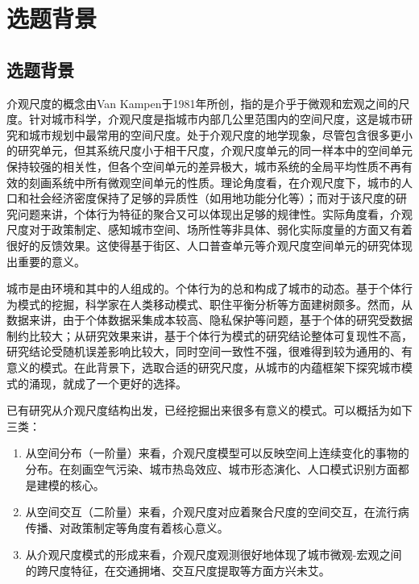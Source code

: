 \chapter{选题背景}
\setcounter{page}{1}


\section{选题背景} %


介观尺度的概念由Van Kampen于1981年所创，指的是介乎于微观和宏观之间的尺度。针对城市科学，介观尺度是指城市内部几公里范围内的空间尺度，这是城市研究和城市规划中最常用的空间尺度。处于介观尺度的地学现象，尽管包含很多更小的研究单元，但其系统尺度小于相干尺度，介观尺度单元的同一样本中的空间单元保持较强的相关性，但各个空间单元的差异极大，城市系统的全局平均性质不再有效的刻画系统中所有微观空间单元的性质。理论角度看，在介观尺度下，城市的人口和社会经济密度保持了足够的异质性（如用地功能分化等）；而对于该尺度的研究问题来讲，个体行为特征的聚合又可以体现出足够的规律性。实际角度看，介观尺度对于政策制定、感知城市空间、场所性等非具体、弱化实际度量的方面又有着很好的反馈效果。这使得基于街区、人口普查单元等介观尺度空间单元的研究体现出重要的意义。


城市是由环境和其中的人组成的。个体行为的总和构成了城市的动态。基于个体行为模式的挖掘，科学家在人类移动模式、职住平衡分析等方面建树颇多。然而，从数据来讲，由于个体数据采集成本较高、隐私保护等问题，基于个体的研究受数据制约比较大；从研究效果来讲，基于个体行为模式的研究结论整体可复现性不高，研究结论受随机误差影响比较大，同时空间一致性不强，很难得到较为通用的、有意义的模式。在此背景下，选取合适的研究尺度，从城市的内蕴框架下探究城市模式的涌现，就成了一个更好的选择。


已有研究从介观尺度结构出发，已经挖掘出来很多有意义的模式。可以概括为如下三类：\begin{enumerate}
    \item 从空间分布（一阶量）来看，介观尺度模型可以反映空间上连续变化的事物的分布。在刻画空气污染\cite{mijling2012using}、城市热岛效应、城市形态演化\cite{raimbault2018calibration}、人口模式识别方面都是建模的核心。
    \item 从空间交互（二阶量）来看，介观尺度对应着聚合尺度的空间交互，在流行病传播、对政策制定等角度有着核心意义。%
    \item 从介观尺度模式的形成来看，介观尺度观测很好地体现了城市微观-宏观之间的跨尺度特征，在交通拥堵、交互尺度提取等方面方兴未艾。
\end{enumerate} 

